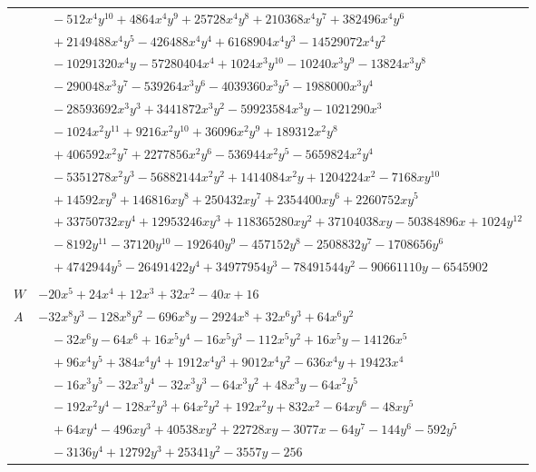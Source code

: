 \documentclass[11pt]{article}
\begin{document}
\begin{longtable}{@{}ll@{}}
 & $\quad -512x^{4}y^{10}+4864x^{4}y^{9}+25728x^{4}y^{8}+210368x^{4}y^{7}+382496x^{4}y^{6}$\\
 & $\quad +2149488x^{4}y^{5}-426488x^{4}y^{4}+6168904x^{4}y^{3}-14529072x^{4}y^{2}$\\
 & $\quad -10291320x^{4}y-57280404x^{4}+1024x^{3}y^{10}-10240x^{3}y^{9}-13824x^{3}y^{8}$\\
 & $\quad -290048x^{3}y^{7}-539264x^{3}y^{6}-4039360x^{3}y^{5}-1988000x^{3}y^{4}$\\
 & $\quad -28593692x^{3}y^{3}+3441872x^{3}y^{2}-59923584x^{3}y-1021290x^{3}$\\
 & $\quad -1024x^{2}y^{11}+9216x^{2}y^{10}+36096x^{2}y^{9}+189312x^{2}y^{8}$\\
 & $\quad +406592x^{2}y^{7}+2277856x^{2}y^{6}-536944x^{2}y^{5}-5659824x^{2}y^{4}$\\
 & $\quad -5351278x^{2}y^{3}-56882144x^{2}y^{2}+1414084x^{2}y+1204224x^{2}-7168xy^{10}$\\
 & $\quad +14592xy^{9}+146816xy^{8}+250432xy^{7}+2354400xy^{6}+2260752xy^{5}$\\
 & $\quad +33750732xy^{4}+12953246xy^{3}+118365280xy^{2}+37104038xy-50384896x+1024y^{12}$\\
 & $\quad -8192y^{11}-37120y^{10}-192640y^{9}-457152y^{8}-2508832y^{7}-1708656y^{6}$\\
 & $\quad +4742944y^{5}-26491422y^{4}+34977954y^{3}-78491544y^{2}-90661110y-6545902$\\
\addlinespace[3pt]
\multicolumn{2}{@{}l}{$g=2$, $i=24$, $m=4$, neighbours $3,4,9,11,25,26,30,33,34$}\\
$W$ & $-20x^{5}+24x^{4}+12x^{3}+32x^{2}-40x+16$\\
$A$ & $-32x^{8}y^{3}-128x^{8}y^{2}-696x^{8}y-2924x^{8}+32x^{6}y^{3}+64x^{6}y^{2}$\\
 & $\quad -32x^{6}y-64x^{6}+16x^{5}y^{4}-16x^{5}y^{3}-112x^{5}y^{2}+16x^{5}y-14126x^{5}$\\
 & $\quad +96x^{4}y^{5}+384x^{4}y^{4}+1912x^{4}y^{3}+9012x^{4}y^{2}-636x^{4}y+19423x^{4}$\\
 & $\quad -16x^{3}y^{5}-32x^{3}y^{4}-32x^{3}y^{3}-64x^{3}y^{2}+48x^{3}y-64x^{2}y^{5}$\\
 & $\quad -192x^{2}y^{4}-128x^{2}y^{3}+64x^{2}y^{2}+192x^{2}y+832x^{2}-64xy^{6}-48xy^{5}$\\
 & $\quad +64xy^{4}-496xy^{3}+40538xy^{2}+22728xy-3077x-64y^{7}-144y^{6}-592y^{5}$\\
 & $\quad -3136y^{4}+12792y^{3}+25341y^{2}-3557y-256$\\

\end{longtable}
\end{document}
